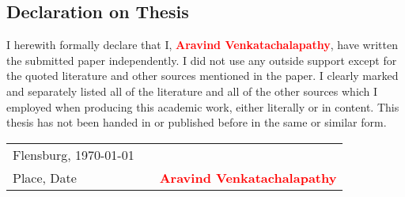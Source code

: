 
\cleardoublepage
{}
\vspace{10cm}
\subsection*{Declaration on Thesis}
\vspace{10cm}

I herewith formally declare that I, \textcolor{red}{\textbf{Aravind Venkatachalapathy}}, have written the submitted paper independently. I did not use any outside support except for the quoted literature and other sources mentioned in the paper. I clearly marked and separately listed all of the literature and all of the other sources which I employed when producing this academic work, either literally or in content. This thesis has not been handed in or published before in the same or similar form.

\vspace{4cm}

\begin{tabular}[h]{l p{2cm} p{7cm}}
Flensburg, \today &  & \\
\cline{1-1}\cline{3-3}
{\small Place, Date}& & {\small \textcolor{red}{\textbf{Aravind Venkatachalapathy}}}\\
\end{tabular}

\vspace{5em}
\newpage
